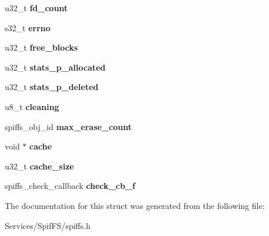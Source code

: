 \begin{DoxyCompactItemize}
\item 
\hypertarget{structspiffs_a85748ccd24efdf21950e951d6dc38d2d}{}u32\+\_\+t {\bfseries fd\+\_\+count}\label{structspiffs_a85748ccd24efdf21950e951d6dc38d2d}

\item 
\hypertarget{structspiffs_aa5a0771bb5ea3ba0c5a5ae112bf2784d}{}s32\+\_\+t {\bfseries errno}\label{structspiffs_aa5a0771bb5ea3ba0c5a5ae112bf2784d}

\item 
\hypertarget{structspiffs_aabf1c80978e2e7b4a16affe2586836f6}{}u32\+\_\+t {\bfseries free\+\_\+blocks}\label{structspiffs_aabf1c80978e2e7b4a16affe2586836f6}

\item 
\hypertarget{structspiffs_a86a2f826e19c2fc2fc79e017856bf1f3}{}u32\+\_\+t {\bfseries stats\+\_\+p\+\_\+allocated}\label{structspiffs_a86a2f826e19c2fc2fc79e017856bf1f3}

\item 
\hypertarget{structspiffs_a7ab5b746b6a8a05ac23654b262641960}{}u32\+\_\+t {\bfseries stats\+\_\+p\+\_\+deleted}\label{structspiffs_a7ab5b746b6a8a05ac23654b262641960}

\item 
\hypertarget{structspiffs_a24ad6365677ca2f0b8b1df84c3dee905}{}u8\+\_\+t {\bfseries cleaning}\label{structspiffs_a24ad6365677ca2f0b8b1df84c3dee905}

\item 
\hypertarget{structspiffs_ada7ec8c29b62bbdd9a62038581fdfc47}{}spiffs\+\_\+obj\+\_\+id {\bfseries max\+\_\+erase\+\_\+count}\label{structspiffs_ada7ec8c29b62bbdd9a62038581fdfc47}

\item 
\hypertarget{structspiffs_a7656cb2dd04486bf2eef477b81661c93}{}void $\ast$ {\bfseries cache}\label{structspiffs_a7656cb2dd04486bf2eef477b81661c93}

\item 
\hypertarget{structspiffs_aa8c68297323f14d429209160164ed6b5}{}u32\+\_\+t {\bfseries cache\+\_\+size}\label{structspiffs_aa8c68297323f14d429209160164ed6b5}

\item 
\hypertarget{structspiffs_ac1c5a97425c7678dbf32ef1f32a20fac}{}spiffs\+\_\+check\+\_\+callback {\bfseries check\+\_\+cb\+\_\+f}\label{structspiffs_ac1c5a97425c7678dbf32ef1f32a20fac}

\end{DoxyCompactItemize}


The documentation for this struct was generated from the following file\+:\begin{DoxyCompactItemize}
\item 
Services/\+Spif\+F\+S/spiffs.\+h\end{DoxyCompactItemize}
